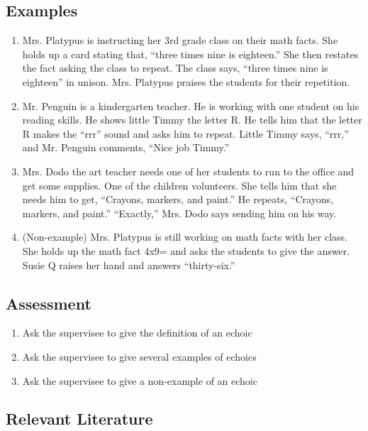\subsection{Examples}
\begin{enumerate}
\item Mrs. Platypus is instructing her 3rd grade class on their math facts.  She holds up a card stating that, ``three times nine is eighteen.''  She then restates the fact asking the class to repeat.  The class says, ``three times nine is eighteen'' in unison.  Mrs. Platypus praises the students for their repetition.
\item Mr. Penguin is a kindergarten teacher.  He is working with one student on his reading skills.  He shows little Timmy the letter R.  He tells him that the letter R makes the ``rrr'' sound and asks him to repeat.  Little Timmy says, ``rrr,'' and Mr. Penguin comments, ``Nice job Timmy.''  
\item Mrs. Dodo the art teacher needs one of her students to run to the office and get some supplies. One of the children volunteers.  She tells him that she needs him to get, ``Crayons, markers, and paint.''  He repeats, ``Crayons, markers, and paint.''  ``Exactly,'' Mrs. Dodo says sending him on his way.  
\item (Non-example) Mrs. Platypus is still working on math facts with her class.  She holds up the math fact 4x9= and asks the students to give the answer.  Susie Q raises her hand and answers ``thirty-six.''  
%
\end{enumerate}
%
\subsection{Assessment}
\begin{enumerate}
\item Ask the supervisee to give the definition of an echoic
\item Ask the supervisee to give several examples of echoics
\item Ask the supervisee to give a non-example of an echoic 
%
\end{enumerate}
%
\subsection{Relevant Literature}
\begin{refsection}
\nocite{test,alang2017police,clayton2018black}
\printbibliography[heading=none]
\end{refsection} 
%
